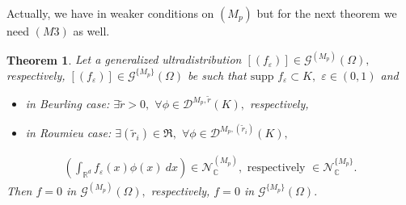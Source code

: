 \documentclass[sn-mathphys,Numbered]{sn-jnl}%
\theoremstyle{thmstyleone}%
\newtheorem{theorem}{Theorem}%
\theoremstyle{thmstyletwo}%
\theoremstyle{thmstylethree}%
\begin{document}
Actually, we have in \cite{ppv} weaker conditions on $(M_p)$ but for the next theorem we need $(M3)$ as well. 


\begin{theorem}\label{thm 4.1}
Let a generalized ultradistribution $[(f_\varepsilon)]\in\mathcal{G}^{(M_p)}(\Omega),$ respectively, $[(f_\varepsilon)]\in \mathcal{G}^{\{M_p\}}(\Omega)$ be such that $\mbox{supp }f_\varepsilon\subset K,$ $\varepsilon\in (0,1)$ and 
\begin{itemize}
\item in Beurling case: $\exists \tilde r>0,$ $\forall \phi\in \mathcal D^{M_p,\tilde r}(K),$ respectively,
\item in Roumieu case: $\exists (\tilde r_i)\in\mathfrak{R},$ $\forall \phi\in \mathcal D^{M_p,(\tilde r_i)}(K),$
\end{itemize}
\begin{align}\label{nulcon}
\left(\int_{\mathbb{R}^d}f_\varepsilon(x)\phi(x)\ dx\right)\in \mathcal{N}^{(M_p)}_\mathbb{C},\text{ respectively }\in \mathcal{N}^{\{M_p\}}_\mathbb{C}.
\end{align}
Then $f=0$ in $\mathcal{G}^{(M_p)}(\Omega),$ respectively, $f=0$ in $\mathcal{G}^{\{M_p\}}(\Omega).$
\end{theorem}
\end{document}
